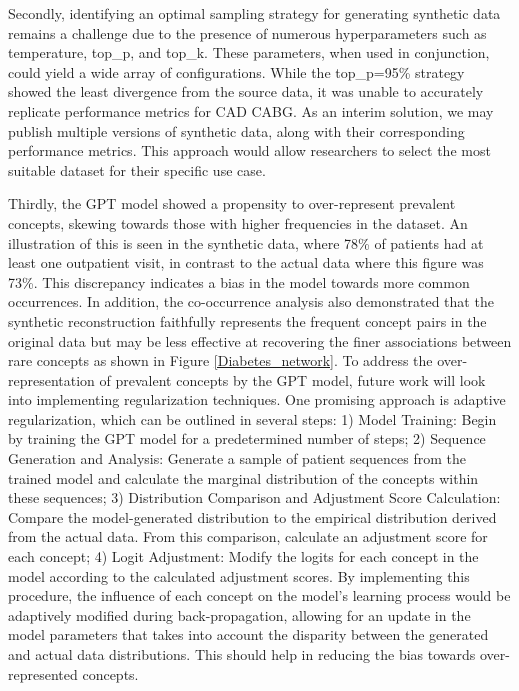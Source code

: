 \begin{multicols}{2}
Secondly, identifying an optimal sampling strategy for generating synthetic data remains a challenge due to the presence of numerous hyperparameters such as temperature, top\_p, and top\_k. These parameters, when used in conjunction, could yield a wide array of configurations. While the top\_p=95\% strategy showed the least divergence from the source data, it was unable to accurately replicate performance metrics for CAD CABG. As an interim solution, we may publish multiple versions of synthetic data, along with their corresponding performance metrics. This approach would allow researchers to select the most suitable dataset for their specific use case. 

Thirdly, the GPT model showed a propensity to over-represent prevalent concepts, skewing towards those with higher frequencies in the dataset. An illustration of this is seen in the synthetic data, where 78\% of patients had at least one outpatient visit, in contrast to the actual data where this figure was 73\%. This discrepancy indicates a bias in the model towards more common occurrences. In addition, the co-occurrence analysis also demonstrated that the synthetic reconstruction faithfully represents the frequent concept pairs in the original data but may be less effective at recovering the finer associations between rare concepts as shown in Figure \ref{Diabetes_network}. To address the over-representation of prevalent concepts by the GPT model, future work will look into implementing regularization techniques. One promising approach is adaptive regularization, which can be outlined in several steps: 1) Model Training: Begin by training the GPT model for a predetermined number of steps; 2) Sequence Generation and Analysis: Generate a sample of patient sequences from the trained model and calculate the marginal distribution of the concepts within these sequences; 3) Distribution Comparison and Adjustment Score Calculation: Compare the model-generated distribution to the empirical distribution derived from the actual data. From this comparison, calculate an adjustment score for each concept; 4) Logit Adjustment: Modify the logits for each concept in the model according to the calculated adjustment scores. By implementing this procedure, the influence of each concept on the model’s learning process would be adaptively modified during back-propagation, allowing for an update in the model parameters that takes into account the disparity between the generated and actual data distributions. This should help in reducing the bias towards over-represented concepts.


\end{multicols}
